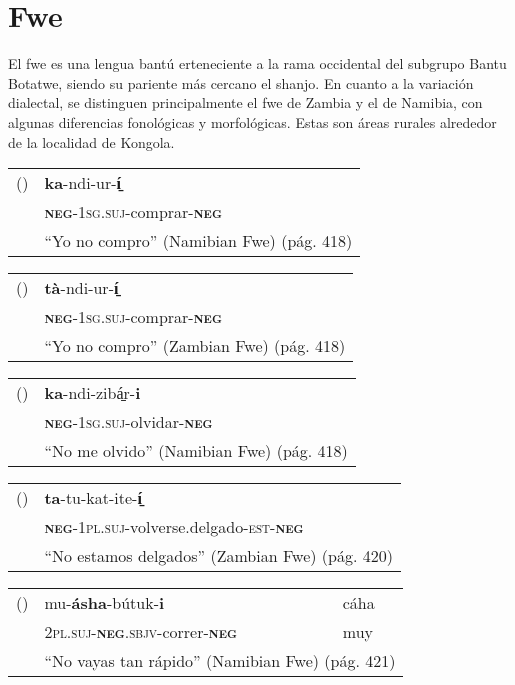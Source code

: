 \section*{Fwe}

\noindent El fwe es una lengua bantú erteneciente a la rama occidental del subgrupo Bantu Botatwe, siendo su pariente más cercano el shanjo. En cuanto a la variación dialectal, se distinguen principalmente el fwe de Zambia y el de Namibia, con algunas diferencias fonológicas y morfológicas. Estas son áreas rurales alrededor de la localidad de Kongola. \vspace{0.5cm}

{\setmainfont{Charis SIL} 

\begin{tabular}{ll}
() & \textbf{ka}-ndi-ur-\textbf{í̠} \\
& \textsc{\textbf{neg}-1sg.suj}-comprar-\textsc{\textbf{neg}}\\
& ``Yo no compro'' (Namibian Fwe) (pág. 418)
\end{tabular} \vspace{0.3cm}

\begin{tabular}{ll}
() & \textbf{tà}-ndi-ur-\textbf{í̠} \\
& \textsc{\textbf{neg}-1sg.suj}-comprar-\textsc{\textbf{neg}}\\
 & ``Yo no compro'' (Zambian Fwe) (pág. 418)
\end{tabular} \vspace{0.3cm}

\begin{tabular}{ll}
() & \textbf{ka}-ndi-zibá̠r-\textbf{i} \\
& \textsc{\textbf{neg}-1sg.suj}-olvidar-\textsc{\textbf{neg}}\\
& ``No me olvido'' (Namibian Fwe) (pág. 418)
\end{tabular} \vspace{0.3cm}

\begin{tabular}{ll}
() & \textbf{ta}-tu-kat-ite-\textbf{í̠} \\
& \textsc{\textbf{neg}-1pl.suj}-volverse.delgado-\textsc{est-\textbf{neg}} \\
& ``No estamos delgados'' (Zambian Fwe) (pág. 420)
\end{tabular} \vspace{0.3cm}

\begin{tabular}{lll}
() & mu-\textbf{ásha}-bútuk-\textbf{i} & cáha \\
& \textsc{2pl.suj-\textbf{neg}.sbjv-}correr-\textsc{\textbf{neg}} & muy \\
& \multicolumn{2}{l}{``No vayas tan rápido'' (Namibian Fwe) (pág. 421)}
\end{tabular} \vspace{0.3cm}

}
